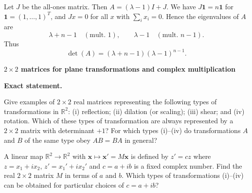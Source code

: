 \begin{solution}
Let $J$ be the all-ones matrix. Then $A=(\lambda-1)I+J$.
We have $J\mathbf 1=n\mathbf 1$ for $\mathbf 1=(1,\dots,1)^T$, and $Jx=0$ for all $x$ with $\sum_i x_i=0$.
Hence the eigenvalues of $A$ are
\[
\lambda+n-1 \quad (\text{mult. }1),\qquad \lambda-1 \quad (\text{mult. }n-1).
\]
Thus
\[
\det(A)=(\lambda+n-1)(\lambda-1)^{n-1}.
\]
\end{solution}

\begin{problem}[CP-I-0070]
\label{prob:cp-i-0070}
\textbf{$2\times2$ matrices for plane transformations and complex multiplication}

\textbf{Exact statement.}

	\par\hspace*{1.5em}\textbullet\quad Give examples of $2\times 2$ real matrices representing the following types of transformations in $\mathbb R^2$:
	(i) reflection; (ii) dilation (or scaling); (iii) shear; and (iv) rotation.
	Which of these types of transformation are always represented by a $2\times 2$ matrix with determinant $+1$?
	For which types (i)--(iv) do transformations $A$ and $B$ of the same type obey $AB=BA$ in general?
	\par\noindent\textbullet\quad A linear map $\mathbb R^2\to\mathbb R^2$ with $\mathbf x\mapsto \mathbf x'=M\mathbf x$ is defined by
	$z' = cz$ where $z=x_1+i x_2$, $z'=x_1'+i x_2'$ and $c=a+ib$ is a fixed complex number.
	Find the real $2\times 2$ matrix $M$ in terms of $a$ and $b$.
	Which types of transformations (i)--(iv) can be obtained for particular choices of $c=a+ib$?

\end{problem}

